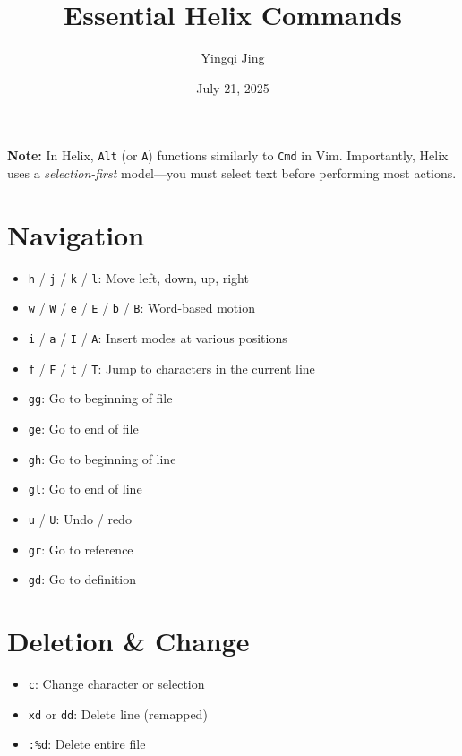 \documentclass[
  letterpaper,
  DIV=11,
  numbers=noendperiod]{scrartcl}
\title{Essential Helix Commands}
\author{Yingqi Jing}
\date{July 21, 2025}
\providecommand{\tightlist}{%
  \setlength{\itemsep}{0pt}\setlength{\parskip}{0pt}}\usepackage{longtable,booktabs,array}
\renewcommand*\contentsname{Table of contents}
\newcommand\contentsname{Table of contents}
\begin{document}
\maketitle

\renewcommand*\contentsname{Contents}
{
\hypersetup{linkcolor=}
\setcounter{tocdepth}{4}
\tableofcontents
}
\listoffigures
\listoftables

\clearpage

\textbf{Note:} In Helix, \texttt{Alt} (or \texttt{A}) functions
similarly to \texttt{Cmd} in Vim. Importantly, Helix uses a
\emph{selection-first} model---you must select text before performing
most actions.

\section{Navigation}\label{navigation}

\begin{itemize}
\tightlist
\item
  \texttt{h} / \texttt{j} / \texttt{k} / \texttt{l}: Move left, down,
  up, right
\item
  \texttt{w} / \texttt{W} / \texttt{e} / \texttt{E} / \texttt{b} /
  \texttt{B}: Word-based motion
\item
  \texttt{i} / \texttt{a} / \texttt{I} / \texttt{A}: Insert modes at
  various positions
\item
  \texttt{f} / \texttt{F} / \texttt{t} / \texttt{T}: Jump to characters
  in the current line
\item
  \texttt{gg}: Go to beginning of file
\item
  \texttt{ge}: Go to end of file
\item
  \texttt{gh}: Go to beginning of line
\item
  \texttt{gl}: Go to end of line
\item
  \texttt{u} / \texttt{U}: Undo / redo
\item
  \texttt{gr}: Go to reference
\item
  \texttt{gd}: Go to definition
\end{itemize}

\section{Deletion \& Change}\label{deletion-change}

\begin{itemize}
\tightlist
\item
  \texttt{c}: Change character or selection
\item
  \texttt{xd} or \texttt{dd}: Delete line (remapped)
\item
  \texttt{:\%d}: Delete entire file
\end{itemize}
\end{document}
